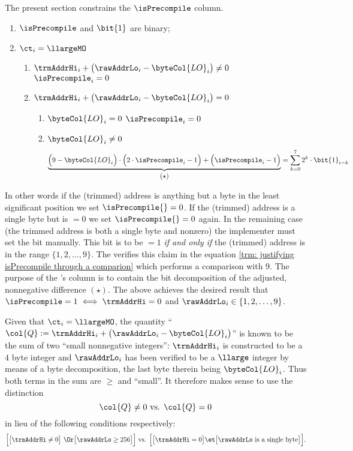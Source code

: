 The present section constrains the $\isPrecompile$ column.
\begin{enumerate}
	\item $\isPrecompile$ and $\bit{1}$ are binary;
	\item \If $\ct_{i} = \llargeMO$ \Then
	\begin{enumerate}
		\item \If $\trmAddrHi_{i} + \big(\rawAddrLo_{i} - \byteCol{LO}_{i}\big) \neq 0$ \Then $\isPrecompile_{i} = 0$
		\item \If $\trmAddrHi_{i} + \big(\rawAddrLo_{i} - \byteCol{LO}_{i}\big) = 0$ \Then 
		\begin{enumerate}
			\item \If $\byteCol{LO}_{i} = 0$ \Then $\isPrecompile_{i} = 0$
			\item\label{trm: justifying isPrecompile through a comparion} \If $\byteCol{LO}_{i} \neq 0$ \Then
			\[
				\underbrace{\Big( 9 - \byteCol{LO}_{i} \Big)
				\cdot
				\Big( 2 \cdot \isPrecompile_{i} - 1 \Big)
				+
				\Big( \isPrecompile_{i} - 1 \Big)}_{\displaystyle (\star) }
				=
				\sum_{k = 0}^7
				2^k \cdot \bit{1}_{i - k}
			\]
		\end{enumerate}
	\end{enumerate}
\end{enumerate}
In other words if the (trimmed) address is anything but a byte in the least significant position we set $\isPrecompile{} = 0$. If the (trimmed) address is a single byte but is $=0$ we set $\isPrecompile{} = 0$ again. In the remaining case (the trimmed address is both a single byte and nonzero) the implementer must set the \isPrecompile{} bit manually. This bit is to be $=1$ \emph{if and only if} the (trimmed) address is in the range $\{1, 2,\dots, 9\}$. The \zkEvm{} verifies this claim in the equation \ref{trm: justifying isPrecompile through a comparion} which performs a comparison with $9$. The purpose of the 's column is to contain the bit decomposition of the adjusted, nonnegative difference $(\star)$. The above achieves the desired result that $\isPrecompile = 1 \iff \trmAddrHi = 0$ and $\rawAddrLo_{i} \in \{1, 2, \dots, 9 \}$.

\saNote{} Given that $\ct_{i} = \llargeMO$, the quantity ``$\col{Q} := \trmAddrHi_{i} + \big(\rawAddrLo_{i} - \byteCol{LO}_{i}\big)$'' is known to be the sum of two ``small nonnegative integers'': $\trmAddrHi_{i}$ is constructed to be a $4$ byte integer and $\rawAddrLo_{i}$ has been verified to be a $\llarge$ integer by means of a byte decomposition, the last byte therein being $\byteCol{LO}_{i}$. Thus both terms in the sum are $\geq$ and ``small''. It therefore makes sense to use the distinction
\[
	\col{Q} \neq 0
	\text{ vs. }
	\col{Q} = 0
\]
in lieu of the following conditions respectively:
\[
	\Big[\big[\trmAddrHi \neq 0\big] ~ \Or \big[\rawAddrLo \geq 256\big]\Big]
	\text{ vs. }
	\Big[\big[\trmAddrHi = 0\big] \et \big[\rawAddrLo\text{ is a single byte}\big]\Big].
\]